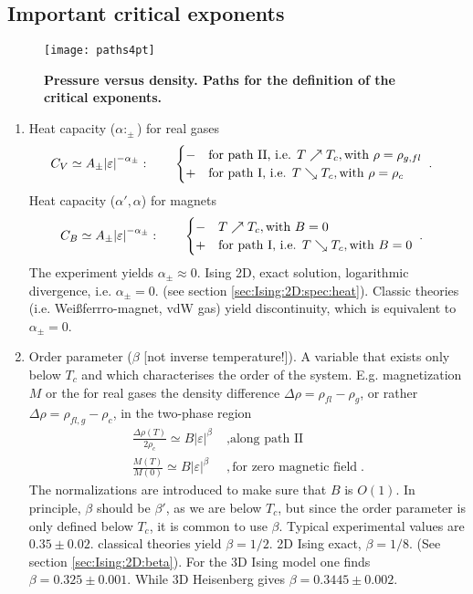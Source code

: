 \subsection{Important critical exponents}


\begin{figure}[htbp]
\begin{center}
\texttt{[image: paths4pt]}
\caption{{\bf Pressure versus density. Paths for the definition of the critical exponents.}}
\end{center}
\end{figure}



\begin{enumerate}
	\item Heat capacity ($\alpha:_{\pm}$) for real gases 
%
\begin{align}\label{eq:heat:capacity}
C_{V}&\simeq A_{\pm} \abs{\varepsilon}^{-\alpha_{\pm}}
:\qquad\begin{cases}
- &\text{for path II, i.e. } T \nearrow 	T_{c}, \text{with } \rho=\rho_{g,fl}\\
+ &\text{for path I, i.e. } T \searrow 	T_{c}, \text{with } \rho=\rho_{c}
\end{cases}\;.
\end{align}
%
Heat capacity ($\alpha',\alpha$) for magnets
\begin{align}\label{eq:}
C_{B}&\simeq  A_{\pm} \abs{\varepsilon}^{-\alpha_{\pm}}
:\qquad \begin{cases}
- & T \nearrow 	T_{c}, \text{with } B=0\\
 + &\text{for path I, i.e. } T \searrow 	T_{c}, \text{with } B=0
\end{cases}\;.
\end{align}
The experiment yields $\alpha_{\pm}\approx 0$. Ising 2D, exact solution, logarithmic divergence, i.e. $\alpha_{\pm}=0$. 
{\color{blue}(see section \ref{sec:Ising:2D:spec:heat}).}
Classic theories (i.e. Weißferrro-magnet, vdW gas) yield discontinuity,
which is equivalent to $\alpha_{\pm}=0$.
\item Order parameter ($\beta$ [not inverse temperature!]). A variable that exists only below $T_{c}$ and which characterises the order of the system.
E.g. magnetization $M$ or the for real gases the density difference 
$\Delta \rho = \rho_{fl}-\rho_{g}$, or rather $\Delta \rho = \rho_{fl,g}-\rho_{c}$, in the 
two-phase region
%
%
\begin{align}\label{eq:}
\frac{\Delta \rho(T)}{2 \rho_{c}} \simeq B|\varepsilon|^{\beta}&\;,\text{along path II}\\
\frac{M(T)}{M(0)} \simeq B|\varepsilon|^{\beta}&\;,\text{for zero magnetic field} \;.
\end{align}
%
The normalizations are introduced to make sure that $B$ is $O(1)$.
In principle, $\beta$ should be $\beta'$, as we are below $T_{c}$, but since the order parameter 
is only defined below $T_{c}$, it is common to use $\beta$. Typical experimental values are $0.35\pm 0.02$. classical theories yield $\beta=1/2$. 2D Ising exact, $\beta=1/8$. {\color{blue}(See section \ref{sec:Ising:2D:beta}).}
For the 3D Ising model one finds $\beta=0.325\pm 0.001$. While 3D Heisenberg gives $\beta=0.3445\pm 0.002$.


\end{enumerate}
